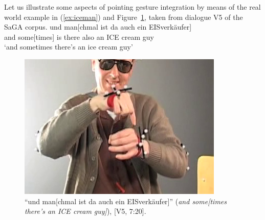 \documentclass[output=paper]{langsci/langscibook}
\begin{document}
Let us illustrate some aspects of pointing gesture integration by means of the real world example in (\ref{ex:iceman}) and Figure~\ref{fig:iceman}, taken from dialogue V5 of the SaGA corpus. %
%
\ea \label{ex:iceman}
\gll und man[chmal ist da auch ein {EISverkäufer}] \\
     and some[times] is there also an {ICE cream guy} \\
\glt \enquote*{and sometimes there's an ice cream guy}
\z 

\begin{figure}[tb]
  \centering
  \includegraphics[width=0.5\linewidth]{figures/iceman}
  \caption[Ice cream guy]{\enquote{und man[chmal ist da auch ein EISverkäufer]} (\textit{and some[times there's an ICE cream guy]}), [V5, 7:20].}
  \label{fig:iceman}
\end{figure}
\end{document}
